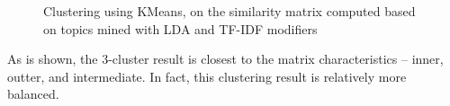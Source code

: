 \documentclass[11pt]{article}
\begin{document}
\begin{figure}[htp!]
  \centering
  \caption{Clustering using KMeans, on the similarity matrix computed based on topics mined with LDA and TF-IDF modifiers}
\end{figure}

\vspace{1em}
As is shown, the 3-cluster result is closest to the matrix characteristics -- inner, outter, and intermediate.
In fact, this clustering result is relatively more balanced.
\end{document}
